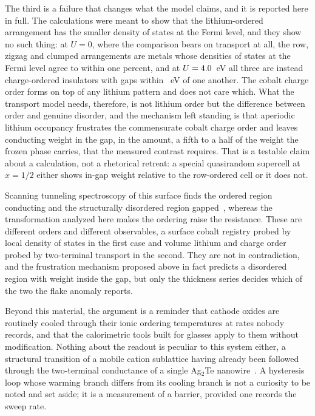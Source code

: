 \documentclass[reprint,twocolumn,prb,amsmath,amssymb,superscriptaddress,floatfix]{revtex4-2}
\begin{document}
The third is a failure that changes what the model claims, and it is reported here in full. The
calculations were meant to show that the lithium-ordered arrangement has the smaller density of
states at the Fermi level, and they show no such thing: at $U=0$, where the comparison bears on
transport at all, the row, zigzag and clumped arrangements are metals whose densities of states
at the Fermi level agree to within one percent, and at $U=4.0$~eV all three are instead
charge-ordered insulators with gaps within \gapMotifSpread~eV of one another. The cobalt charge
order forms on top of any lithium pattern and does not care which. What the transport model
needs, therefore, is not lithium order but the difference between order and genuine disorder,
and the mechanism left standing is that aperiodic lithium occupancy frustrates the commensurate
cobalt charge order and leaves conducting weight in the gap, in the amount, a fifth to a half of
the weight the frozen phase carries, that the measured contrast requires. That is a testable
claim about a calculation, not a rhetorical retreat: a special quasirandom supercell at $x=1/2$
either shows in-gap weight relative to the row-ordered cell or it does not.

Scanning tunneling spectroscopy of this surface finds the ordered region conducting and the
structurally disordered region gapped~\cite{Iwaya2013}, whereas the transformation analyzed here
makes the ordering raise the resistance. These are different orders and different observables,
a surface cobalt registry probed by local density of states in the first case and volume lithium
and charge order probed by two-terminal transport in the second. They are not in contradiction,
and the frustration mechanism proposed above in fact predicts a disordered region with weight
inside the gap, but only the thickness series decides which of the two the flake anomaly
reports.

Beyond this material, the argument is a reminder that cathode oxides are routinely cooled
through their ionic ordering temperatures at rates nobody records, and that the calorimetric
tools built for glasses apply to them without modification. Nothing about the readout is peculiar
to this system either, a structural transition of a mobile cation sublattice having already been
followed through the two-terminal conductance of a single Ag$_2$Te
nanowire~\cite{Premasiri2019}. A hysteresis loop whose warming
branch differs from its cooling branch is not a curiosity to be noted and set aside; it is a
measurement of a barrier, provided one records the sweep rate.
\end{document}
